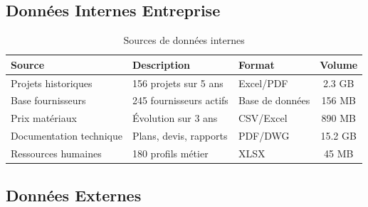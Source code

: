 \documentclass[12pt, a4paper]{report}
\begin{document}
\subsection{Données Internes Entreprise}

\begin{table}[h]
\centering
\caption{Sources de données internes}
\begin{tabular}{|l|p{4cm}|p{3cm}|c|}
\hline
\textbf{Source} & \textbf{Description} & \textbf{Format} & \textbf{Volume} \\
\hline
Projets historiques & 156 projets sur 5 ans & Excel/PDF & 2.3 GB \\
\hline
Base fournisseurs & 245 fournisseurs actifs & Base de données & 156 MB \\
\hline
Prix matériaux & Évolution sur 3 ans & CSV/Excel & 890 MB \\
\hline
Documentation technique & Plans, devis, rapports & PDF/DWG & 15.2 GB \\
\hline
Ressources humaines & 180 profils métier & XLSX & 45 MB \\
\hline
\end{tabular}
\end{table}

\subsection{Données Externes}
\end{document}
